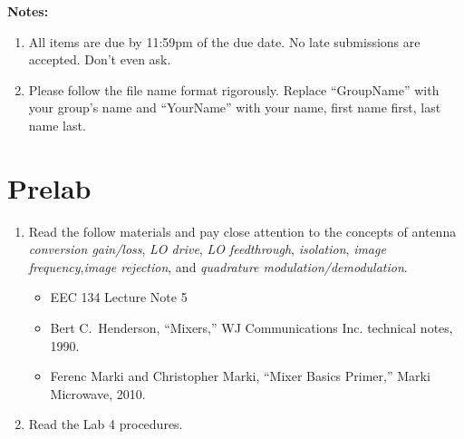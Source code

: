 \documentclass[letterpaper, 11pt]{article}
\begin{document}
\textbf{Notes:}
\begin{enumerate}
	\item All items are due by 11:59pm of the due date. No late submissions are accepted. Don't even ask. 
	
	\item Please follow the file name format rigorously. Replace ``GroupName'' with your group's name and ``YourName'' with your name, first name first, last name last. 
\end{enumerate}


\section{Prelab}
\begin{enumerate}
	\item Read the follow materials and pay close attention to the concepts of antenna \textit{conversion gain/loss}, \textit{LO drive}, \textit{LO feedthrough}, \textit{isolation}, \textit{image frequency},\textit{image rejection}, and \textit{quadrature modulation/demodulation}. 
	\begin{itemize}
		\item EEC 134 Lecture Note 5 
		
		\item Bert C.~Henderson, ``Mixers,'' WJ Communications Inc. technical notes, 1990. 
		\item Ferenc Marki and Christopher Marki, ``Mixer Basics Primer,'' Marki Microwave, 2010.
	\end{itemize}
	\item Read the Lab 4 procedures. 

\end{enumerate}


\reversemarginpar
{}
\end{document}
